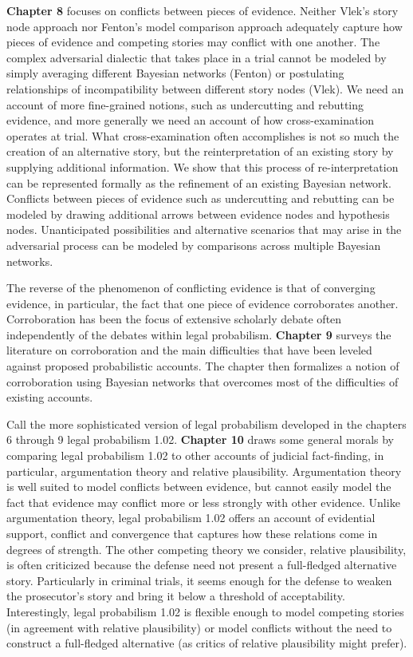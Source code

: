 \documentclass[
  10pt,
  dvipsnames,enabledeprecatedfontcommands]{scrartcl}
\begin{document}
\textbf{Chapter 8} focuses on conflicts between pieces of evidence.
Neither Vlek's story node approach nor Fenton's model comparison
approach adequately capture how pieces of evidence and competing stories
may conflict with one another. The complex adversarial dialectic that
takes place in a trial cannot be modeled by simply averaging different
Bayesian networks (Fenton) or postulating relationships of
incompatibility between different story nodes (Vlek). We need an account
of more fine-grained notions, such as undercutting and rebutting
evidence, and more generally we need an account of how cross-examination
operates at trial. What cross-examination often accomplishes is not so
much the creation of an alternative story, but the reinterpretation of
an existing story by supplying additional information. We show that this
process of re-interpretation can be represented formally as the
refinement of an existing Bayesian network. Conflicts between pieces of
evidence such as undercutting and rebutting can be modeled by drawing
additional arrows between evidence nodes and hypothesis nodes.
Unanticipated possibilities and alternative scenarios that may arise in
the adversarial process can be modeled by comparisons across multiple
Bayesian networks.

The reverse of the phenomenon of conflicting evidence is that of
converging evidence, in particular, the fact that one piece of evidence
corroborates another. Corroboration has been the focus of extensive
scholarly debate often independently of the debates within legal
probabilism. \textbf{Chapter 9} surveys the literature on corroboration
and the main difficulties that have been leveled against proposed
probabilistic accounts. The chapter then formalizes a notion of
corroboration using Bayesian networks that overcomes most of the
difficulties of existing accounts.

Call the more sophisticated version of legal probabilism developed in
the chapters 6 through 9 legal probabilism 1.02. \textbf{Chapter 10}
draws some general morals by comparing legal probabilism 1.02 to other
accounts of judicial fact-finding, in particular, argumentation theory
and relative plausibility. Argumentation theory is well suited to model
conflicts between evidence, but cannot easily model the fact that
evidence may conflict more or less strongly with other evidence. Unlike
argumentation theory, legal probabilism 1.02 offers an account of
evidential support, conflict and convergence that captures how these
relations come in degrees of strength. The other competing theory we
consider, relative plausibility, is often criticized because the defense
need not present a full-fledged alternative story. Particularly in
criminal trials, it seems enough for the defense to weaken the
prosecutor's story and bring it below a threshold of acceptability.
Interestingly, legal probabilism 1.02 is flexible enough to model
competing stories (in agreement with relative plausibility) or model
conflicts without the need to construct a full-fledged alternative (as
critics of relative plausibility might prefer).
\end{document}

